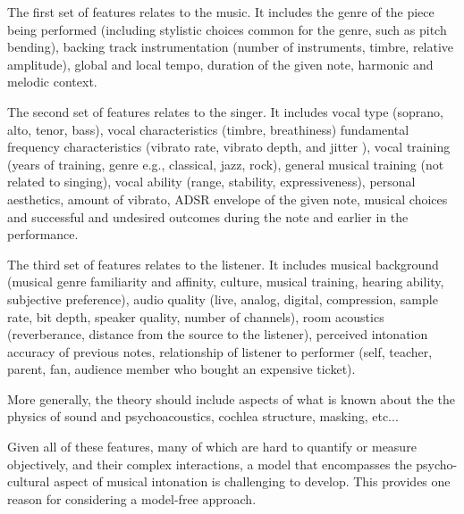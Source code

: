 The first set of features relates to the music. It includes the genre of the piece being performed (including stylistic choices common for the genre, such as pitch bending), backing track instrumentation (number of instruments, timbre, relative amplitude), global and local tempo, duration of the given note, harmonic and melodic context.

The second set of features relates to the singer. It includes vocal type (soprano, alto, tenor, bass), vocal characteristics (timbre, breathiness) fundamental frequency characteristics (vibrato rate, vibrato depth, and jitter \cite{devaney2020new}), vocal training (years of training, genre e.g., classical, jazz, rock), general musical training (not related to singing), vocal ability (range, stability, expressiveness), personal aesthetics, amount of vibrato, ADSR envelope of the given note, musical choices and successful and undesired outcomes during the note and earlier in the performance.

The third set of features relates to the listener. It includes musical background (musical genre familiarity and affinity, culture, musical training, hearing ability, subjective preference), audio quality (live, analog, digital, compression, sample rate, bit depth, speaker quality, number of channels), room acoustics (reverberance, distance from the source to the listener), perceived intonation accuracy of previous notes, relationship of listener to performer (self, teacher, parent, fan, audience member who bought an expensive ticket).

More generally, the theory should include aspects of what is known about the the physics of sound and psychoacoustics, cochlea structure, masking, etc...

Given all of these features, many of which are hard to quantify or measure objectively, and their complex interactions, a model that encompasses the psycho-cultural aspect of musical intonation is challenging to develop. This provides one reason for considering a model-free approach.

